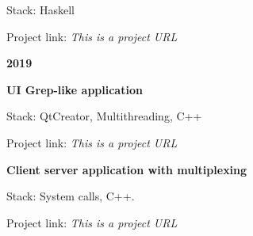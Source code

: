 \documentclass[11pt,a4paper]{report}
\begin{document}
\hspace{20px} Stack: Haskell

\hspace{20px} Project link: \emph{This is a project URL}

\vspace{10px}
\textbf{\Large{2019}}

\hspace{10px} \textbf{UI Grep-like application}

\hspace{20px} Stack: QtCreator, Multithreading, C++

\hspace{20px} Project link: \emph{This is a project URL}

\vspace{10px}

\hspace{10px} \textbf{Client server application with multiplexing}

\hspace{20px} Stack: System calls, C++.

\hspace{20px} Project link: \emph{This is a project URL}
\end{document}
